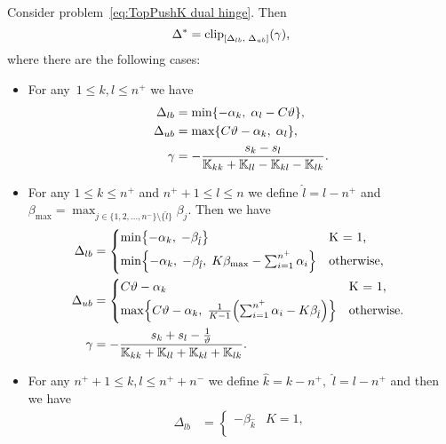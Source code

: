 \begin{theorem}\label{thm:Update rule TopPushK with hinge loss}
  Consider problem~\eqref{eq:TopPushK dual hinge}. Then
  \begin{equation*}
    \Delta^{*} = \clip{\Delta_{lb}}{\Delta_{ub}}{\gamma},
  \end{equation*}
  where there are the following cases:
  \begin{itemize}
    \item For any~$1\le k, l \le n^+$ we have
    \begin{align*}
      \Delta_{lb} & = \min\{- \alpha_k,\; \alpha_l - C \vartheta \}, \\
      \Delta_{ub} & = \max\{C \vartheta - \alpha_k,\; \alpha_l \}, \\
      \gamma      & = -\frac{s_k - s_l}{\mathbb{K}_{kk} + \mathbb{K}_{ll} - \mathbb{K}_{kl} - \mathbb{K}_{lk}}.
    \end{align*}
    \item For any $1 \le k \le n^+$ and $n^+ + 1 \le l \le n$ we define $\hat{l} = l - n^+$ and $\beta_{\max} = \max_{j \in \{1, 2, \ldots, n^- \} \setminus \{\hat l\}} \beta_j.$ Then we have
    \begin{align*}
      \Delta_{lb} & = 
        \begin{cases*}
          \min \Brac[c]{- \alpha_k,\;  -\beta_{\hat{l}}} & K = 1, \\
          \min \Brac[c]{- \alpha_k,\;  -\beta_{\hat{l}}, \; K\beta_{\max} - \sum_{i = 1}^{n^+} \alpha_i} & \textrm{otherwise},
        \end{cases*} \\
      \Delta_{ub} & = 
        \begin{cases*}
            C \vartheta - \alpha_k & K = 1, \\
            \max \Brac[c]{C \vartheta - \alpha_k, \; \frac{1}{K-1}\Brac{\sum_{i = 1}^{n^+} \alpha_i - K \beta_{\hat{l}}}}  & \textrm{otherwise}.
        \end{cases*} \\
      \gamma & = - \frac{s_k + s_l - \frac{1}{\vartheta}}{\K_{kk} + \K_{ll} + \K_{kl} + \K_{lk}}.
    \end{align*}
    \item For any $n^+ + 1\le k,l \le n^+ + n^-$ we define $\hat{k} = k - n^+,$ $\hat{l} = l - n^+$ and then we have
    \begin{align*}
      \Delta_{lb} & = 
        \begin{cases*}
          - \beta_{\hat{k}} & K = 1, \\

\end{cases*}
\end{align*}
\end{itemize}
\end{theorem}
